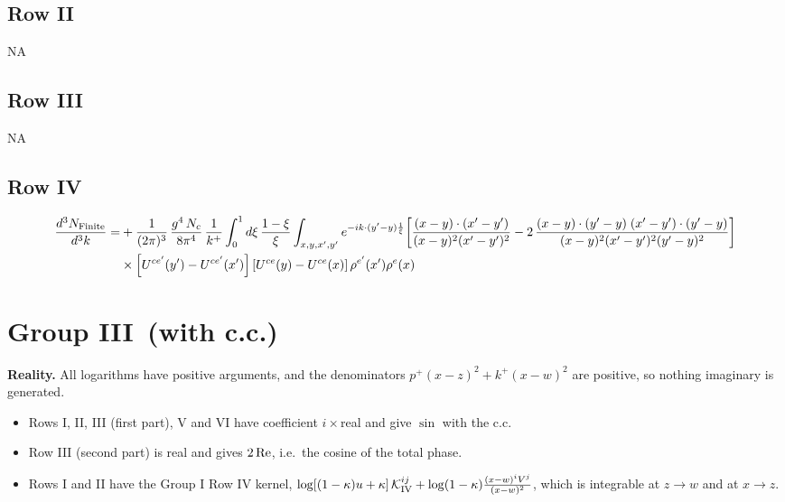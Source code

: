 \documentclass[9pt]{article}
\numberwithin{equation}{section}
\begin{document}
\subsection{Row II}
\textsc{NA}
\subsection{Row III}
\textsc{NA}
\subsection{Row IV}
\begin{align}
\frac{d^{3}N_{\rm Finite}}{d^{3}k}= &  +\frac{1}{(2\pi)^{3}}\,\frac{g^{4}\,N_{c}}{8\pi^{4}}\,\frac{1}{k^{+}}\int_{0}^{1}d\xi\,\frac{1-\xi}{\xi}\int_{x,y,x',y'}e^{-ik\cdot(y'-y)\frac{1}{\xi}}\bigg[\frac{(x-y)\cdot(x'-y')}{(x-y)^{2}(x'-y')^{2}}-2\,\frac{(x-y)\cdot(y'-y)\;(x'-y')\cdot(y'-y)}{(x-y)^{2}(x'-y')^{2}(y'-y)^{2}}\bigg]\notag\\
&\times\left[U^{ce'}(y') - U^{ce'}(x')\right]\left[U^{ce}(y) - U^{ce}(x)\right]\rho^{e'}(x')\rho^{e}(x)
\end{align}
\section{Group III\, (with c.c.)}
{\color{red}\textbf{Reality.} All logarithms have positive arguments, and the denominators $p^{+}(x-z)^{2}+k^{+}(x-w)^{2}$ are positive, so nothing imaginary is generated.
\begin{itemize}
\item Rows I, II, III (first part), V and VI have coefficient $i\times$real and give $\sin$ with the c.c.
\item Row III (second part) is real and gives $2\,{\rm Re}$, i.e.\ the cosine of the total phase.
\item Rows I and II have the Group I Row IV kernel, $\log[(1-\kappa)u+\kappa]\,\mathcal K^{ij}_{\rm IV}+\log(1-\kappa)\frac{(x-w)^{i}V^{j}}{(x-w)^{2}}$, which is integrable at $z\to w$ and at $x\to z$.
\end{itemize}}
\end{document}
